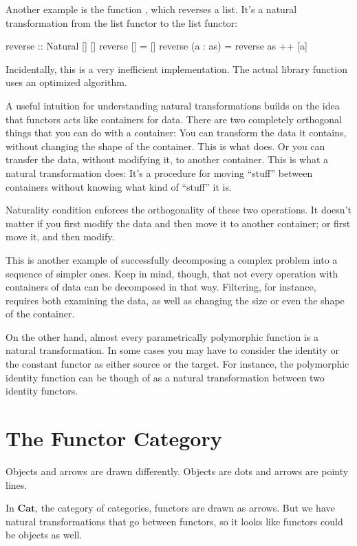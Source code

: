 \documentclass[DaoFP]{subfiles}
\begin{document}
Another example is the function , which reverses a list. It's a natural transformation from the list functor to the list functor:
\begin{haskell}
reverse :: Natural [] []
reverse [] = []
reverse (a : as) = reverse as ++ [a]
\end{haskell}
Incidentally, this is a very inefficient implementation. The actual library function uses an optimized algorithm.

A useful intuition for understanding natural transformations builds on the idea that functors acts like containers for data. There are two completely orthogonal things that you can do with a container: You can transform the data it contains, without changing the shape of the container. This is what  does. Or you can transfer the data, without modifying it, to another container. This is what a natural transformation does: It's a procedure for moving ``stuff'' between containers without knowing what kind of ``stuff'' it is. 

Naturality condition enforces the orthogonality of these two operations. It doesn't matter if you first modify the data and then move it to another container; or first move it, and then modify. 

This is another example of successfully decomposing a complex problem into a sequence of simpler ones. Keep in mind, though, that not every operation with containers of data can be decomposed in that way. Filtering, for instance, requires both examining the data, as well as changing the size or even the shape of the container. 

On the other hand, almost every parametrically polymorphic function is a natural transformation. In some cases you may have to consider the identity or the constant functor as either source or the target. For instance, the polymorphic identity function can be though of as a natural transformation between two identity functors.

\section{The Functor Category}

Objects and arrows are drawn differently. Objects are dots and arrows are pointy lines.

In $\mathbf{Cat}$, the category of categories, functors are drawn as arrows. But we have natural transformations that go between functors, so it looks like functors could be objects as well. 
\end{document}
